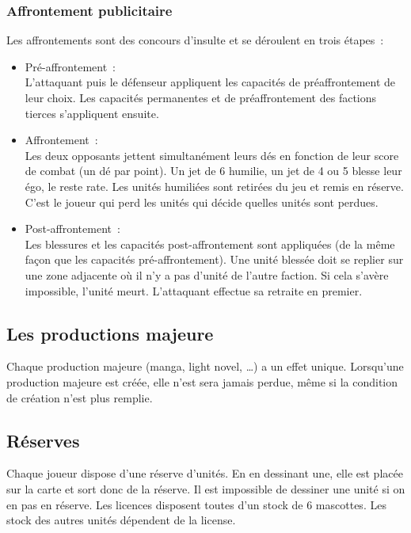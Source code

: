            \subsubsection{Affrontement publicitaire}
                Les affrontements sont des concours d'insulte et se déroulent en trois étapes :
                \begin{itemize}
                    \item Pré-affrontement : \\
                        L'attaquant puis le défenseur appliquent les capacités de préaffrontement de leur choix.
                        Les capacités permanentes et de préaffrontement des factions tierces s'appliquent ensuite.
                    \item Affrontement : \\
                        Les deux opposants jettent simultanément leurs dés en fonction de leur score de combat (un dé par point).
                        Un jet de 6 humilie, un jet de 4 ou 5 blesse leur égo, le reste rate.
                        Les unités humiliées sont retirées du jeu et remis en réserve. C'est le joueur qui perd les unités qui décide quelles unités sont perdues.
                    \item Post-affrontement : \\
                        Les blessures et les capacités post-affrontement sont appliquées (de la même façon que les capacités pré-affrontement).
                        Une unité blessée doit se replier sur une zone adjacente où il n'y a pas d'unité de l'autre faction.
                        Si cela s'avère impossible, l'unité meurt.
                        L'attaquant effectue sa retraite en premier.
                \end{itemize}


        \subsection{Les productions majeure}

            Chaque production majeure (manga, light novel, …) a un effet unique.
            Lorsqu'une production majeure est créée, elle n'est sera jamais perdue, même si la condition de création n'est plus remplie.

        \subsection{Réserves}
            Chaque joueur dispose d'une réserve d'unités. En en dessinant une, elle est placée sur la carte et
            sort donc de la réserve. Il est impossible de dessiner une unité si on en pas en réserve. \newline
            Les licences disposent toutes d'un stock de 6 mascottes. Les stock des autres unités dépendent de
            la license.

